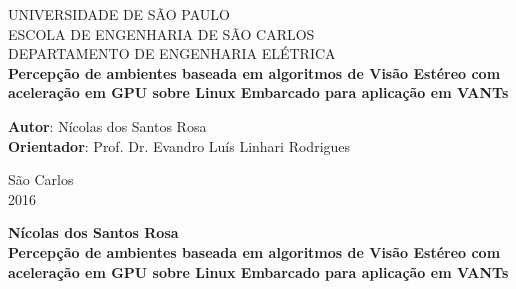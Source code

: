 \begin{titlepage}
	\begin{center}
		\Huge{UNIVERSIDADE DE SÃO PAULO}\\
		\vspace{0.02\textheight}
		\huge{ESCOLA DE ENGENHARIA DE SÃO CARLOS}\\
		\vspace{0.01\textheight}
		\huge{DEPARTAMENTO DE ENGENHARIA ELÉTRICA}\\
		\vspace{0.2\textheight}
		\huge{\textbf{Percepção de ambientes baseada em algoritmos de Visão Estéreo com aceleração em GPU sobre Linux Embarcado para aplicação em VANTs}}
		\vspace{0.2\textheight}
	\end{center}
		
		\large
		{
			\begin{flushleft}
			\Large{ \textbf{Autor}: \hspace{1cm} Nícolas dos Santos Rosa}\\
			\Large{ \textbf{Orientador}: \hspace{0.3cm} Prof. Dr. Evandro Luís Linhari Rodrigues }\\
			\end{flushleft}
	
			\begin{center}
				\vspace{0.09\textheight}
				\Large{São Carlos}\\
				\Large{2016}
			\end{center}
		}
	
\end{titlepage}


\cleardoublepage

	\begin{center}
	\vspace{-0.06\textheight}
		\Large{\textbf{Nícolas dos Santos Rosa}}\\
		\vspace{0.15\textheight}
		\huge{\textbf{Percepção de ambientes baseada em algoritmos de Visão Estéreo com aceleração em GPU sobre Linux Embarcado para aplicação em VANTs}} 
		\vspace{0.08\textheight}
	\end{center}
		
